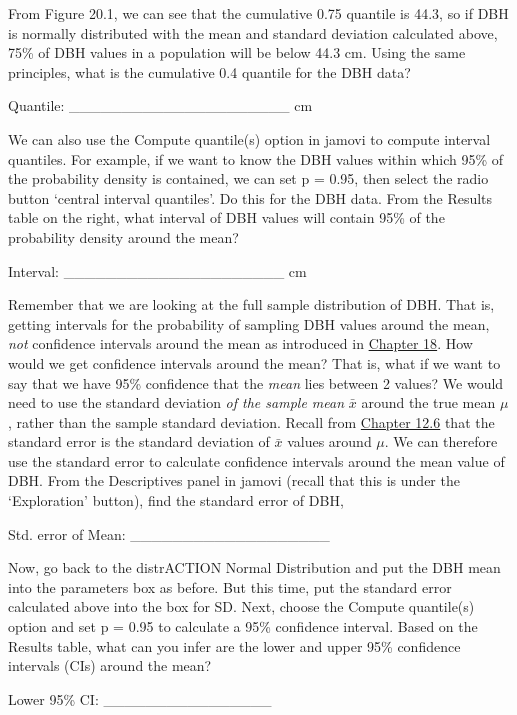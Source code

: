 \documentclass[
  openany]{krantz}
\begin{document}
From Figure 20.1, we can see that the cumulative 0.75 quantile is 44.3, so if DBH is normally distributed with the mean and standard deviation calculated above, 75\% of DBH values in a population will be below 44.3 cm.
Using the same principles, what is the cumulative 0.4 quantile for the DBH data?

Quantile: \_\_\_\_\_\_\_\_\_\_\_\_\_\_\_\_\_\_\_\_\_ cm

We can also use the Compute quantile(s) option in jamovi to compute interval quantiles.
For example, if we want to know the DBH values within which 95\% of the probability density is contained, we can set p = 0.95, then select the radio button `central interval quantiles'.
Do this for the DBH data.
From the Results table on the right, what interval of DBH values will contain 95\% of the probability density around the mean?

Interval: \_\_\_\_\_\_\_\_\_\_\_\_\_\_\_\_\_\_\_\_\_ cm

Remember that we are looking at the full sample distribution of DBH.
That is, getting intervals for the probability of sampling DBH values around the mean, \emph{not} confidence intervals around the mean as introduced in \protect\hyperlink{Chapter_18}{Chapter 18}.
How would we get confidence intervals around the mean?
That is, what if we want to say that we have 95\% confidence that the \emph{mean} lies between 2 values?
We would need to use the standard deviation \emph{of the sample mean} \(\bar{x}\) around the true mean \(\mu\), rather than the sample standard deviation.
Recall from \protect\hyperlink{the-standard-error}{Chapter 12.6} that the standard error is the standard deviation of \(\bar{x}\) values around \(\mu\).
We can therefore use the standard error to calculate confidence intervals around the mean value of DBH.
From the Descriptives panel in jamovi (recall that this is under the `Exploration' button), find the standard error of DBH,

Std. error of Mean: \_\_\_\_\_\_\_\_\_\_\_\_\_\_\_\_\_\_\_

Now, go back to the distrACTION Normal Distribution and put the DBH mean into the parameters box as before.
But this time, put the standard error calculated above into the box for SD.
Next, choose the Compute quantile(s) option and set p = 0.95 to calculate a 95\% confidence interval.
Based on the Results table, what can you infer are the lower and upper 95\% confidence intervals (CIs) around the mean?

Lower 95\% CI: \_\_\_\_\_\_\_\_\_\_\_\_\_\_\_\_
\end{document}
